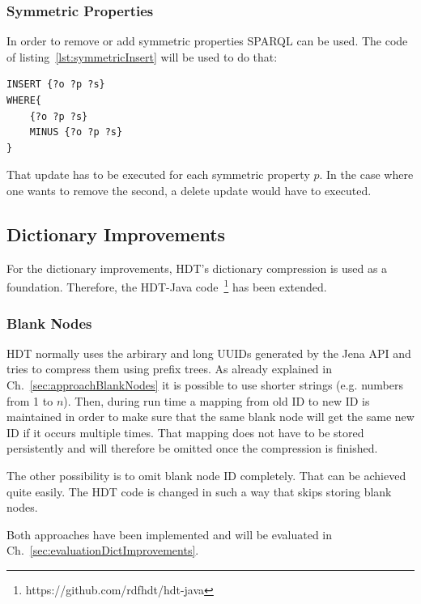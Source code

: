 \subsubsection{Symmetric Properties}

In order to remove or add symmetric properties SPARQL can be used. The code of listing~\ref{lst:symmetricInsert} will be used to do that:

\begin{lstlisting}[captionpos=b, caption=SPARQL query for adding triples with the symmetric property p, label=lst:symmetricInsert,
basicstyle=\ttfamily,frame=single]
INSERT {?o ?p ?s}
WHERE{
	{?o ?p ?s}
	MINUS {?o ?p ?s}
}
\end{lstlisting}

That update has to be executed for each symmetric property $p$. In the case where one wants to remove the second, a delete update would have to executed.

\subsection{Dictionary Improvements}\label{sec:implementationDictImprovements}

For the dictionary improvements, HDT's dictionary compression is used as a foundation. Therefore, the HDT-Java code~\footnote{https://github.com/rdfhdt/hdt-java} has been extended.

\subsubsection{Blank Nodes}\label{sec:implementationBlankNodes}

HDT normally uses the arbirary and long UUIDs generated by the Jena API and tries to compress them using prefix trees. As already explained in Ch.~\ref{sec:approachBlankNodes} it is possible to use shorter strings (e.g. numbers from 1 to $n$). Then, during run time a mapping from old ID to new ID is maintained in order to make sure that the same blank node will get the same new ID if it occurs multiple times. That mapping does not have to be stored persistently and will therefore be omitted once the compression is finished.

The other possibility is to omit blank node ID completely. That can be achieved quite easily. The HDT code is changed in such a way that skips storing blank nodes.

Both approaches have been implemented and will be evaluated in Ch.~\ref{sec:evaluationDictImprovements}.

